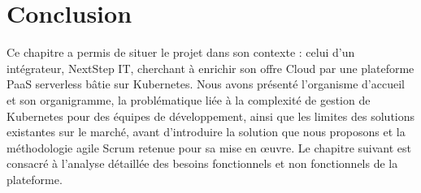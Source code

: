 \section{Conclusion}

Ce chapitre a permis de situer le projet dans son contexte : celui d'un intégrateur, NextStep IT, cherchant à enrichir son offre Cloud par une plateforme PaaS serverless bâtie sur Kubernetes. Nous avons présenté l'organisme d'accueil et son organigramme, la problématique liée à la complexité de gestion de Kubernetes pour des équipes de développement, ainsi que les limites des solutions existantes sur le marché, avant d'introduire la solution que nous proposons et la méthodologie agile Scrum retenue pour sa mise en œuvre. Le chapitre suivant est consacré à l'analyse détaillée des besoins fonctionnels et non fonctionnels de la plateforme.
